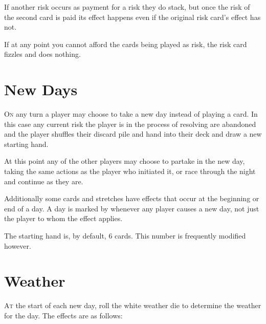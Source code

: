 \documentclass{article}
\begin{document}
\begin{multicols}{3}
    If another risk occurs as payment for a risk they do stack, but once the
    risk of the second card is paid its effect happens even if the original risk
    card's effect has not.

    If at any point you cannot afford the cards being played as risk, the risk
    card fizzles and does nothing.

\section{New Days}

    \textsc{On} any turn a player may choose to take a new day instead of playing a card.
    In this case any current risk the player is in the process of resolving are
    abandoned and the player shuffles their discard pile and hand into their
    deck and draw a new starting hand.

    At this point any of the other players may choose to partake in the new day,
    taking the same actions as the player who initiated it, or race through the
    night and continue as they are.

    Additionally some cards and stretches have effects that occur at the
    beginning or end of a day. A day is marked by whenever any player causes a
    new day, not just the player to whom the effect applies.

    The starting hand is, by default, 6 cards. This number is frequently
    modified however.

\section{Weather}

    \textsc{At} the start of each new day, roll the white weather die to determine the
    weather for the day. The effects are as follows:


\end{multicols}
\end{document}
